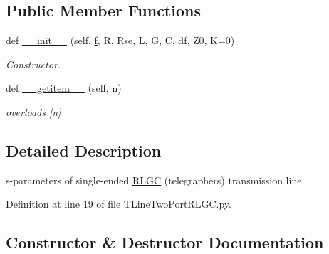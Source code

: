 \subsection*{Public Member Functions}
\begin{DoxyCompactItemize}
\item 
def \hyperlink{classSignalIntegrity_1_1SParameters_1_1Devices_1_1TLineTwoPortRLGC_1_1TLineTwoPortRLGC_a44ea5b94b16c4f9a8ae2b0266c7434d8}{\+\_\+\+\_\+init\+\_\+\+\_\+} (self, \hyperlink{classSignalIntegrity_1_1SParameters_1_1SParameters_1_1SParameters_a32e7a34d6837fe949b413c852a0447f8}{f}, R, Rse, L, G, C, df, Z0, K=0)
\begin{DoxyCompactList}\small\item\em Constructor. \end{DoxyCompactList}\item 
def \hyperlink{classSignalIntegrity_1_1SParameters_1_1Devices_1_1TLineTwoPortRLGC_1_1TLineTwoPortRLGC_ab7a6da5139e0878b590d68292aaa70f2}{\+\_\+\+\_\+getitem\+\_\+\+\_\+} (self, n)
\begin{DoxyCompactList}\small\item\em overloads \mbox{[}n\mbox{]} \end{DoxyCompactList}\end{DoxyCompactItemize}


\subsection{Detailed Description}
s-\/parameters of single-\/ended \hyperlink{namespaceSignalIntegrity_1_1SParameters_1_1RLGC}{R\+L\+GC} (telegraphers) transmission line 

Definition at line 19 of file T\+Line\+Two\+Port\+R\+L\+G\+C.\+py.



\subsection{Constructor \& Destructor Documentation}
\mbox{\label{classSignalIntegrity_1_1SParameters_1_1Devices_1_1TLineTwoPortRLGC_1_1TLineTwoPortRLGC_a44ea5b94b16c4f9a8ae2b0266c7434d8}} 

